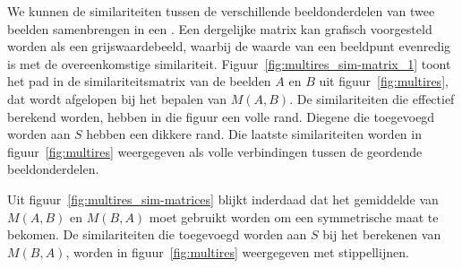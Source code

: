 
We kunnen de similariteiten tussen de verschillende beeldonderdelen van twee beelden
samenbrengen in een . Een dergelijke matrix kan grafisch 
voorgesteld worden als een grijswaardebeeld, waarbij de waarde van een beeldpunt evenredig is met
de overeenkomstige similariteit. Figuur~\ref{fig:multires_sim-matrix_1} toont het pad in de 
similariteitsmatrix van de beelden $A$ en $B$ uit figuur~\ref{fig:multires}, dat wordt afgelopen
bij het bepalen van $M(A,B)$.
De similariteiten die effectief berekend worden, hebben in die figuur een volle rand. Diegene 
die toegevoegd worden aan $S$ hebben een dikkere rand. Die laatste similariteiten 
worden in figuur~\ref{fig:multires} weergegeven als volle verbindingen tussen de
geordende beeldonderdelen. 

Uit figuur~\ref{fig:multires_sim-matrices} blijkt inderdaad dat
het gemiddelde van $M(A,B)$ en $M(B,A)$ moet gebruikt worden om een symmetrische maat te bekomen.
De similariteiten die toegevoegd worden aan $S$ bij het berekenen van $M(B,A)$, worden in 
figuur~\ref{fig:multires} weergegeven met stippellijnen.


